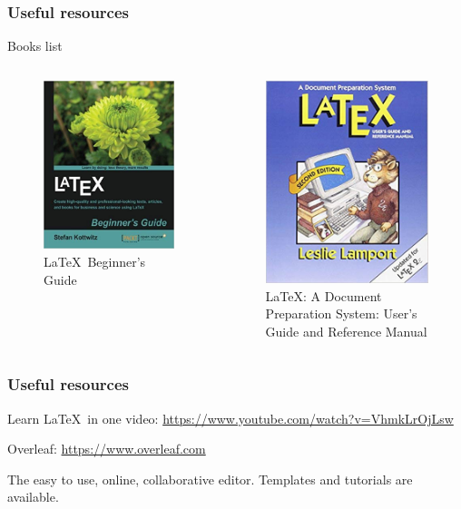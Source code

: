 \documentclass[11pt]{beamer}
\begin{document}
\begin{frame}
	\frametitle{Useful resources}

	Books list
	 \begin{columns}
		\centering
		\begin{figure}
			\includegraphics[width=.5\linewidth]{Figures/BeginnersGuide.jpg}
			\caption{\LaTeX \ Beginner's Guide}
		\end{figure}
		\centering
		\begin{figure}
			\includegraphics[width=.5\linewidth]{Figures/Lamport.jpg}
			\caption{\LaTeX: A Document Preparation System: User's Guide and Reference Manual}
		\end{figure}
	\end{columns}
\end{frame}

\begin{frame}
	\frametitle{Useful resources}

	Learn \LaTeX \ in one video: \url{https://www.youtube.com/watch?v=VhmkLrOjLsw}
	
	\bigskip
	
	Overleaf: \url{https://www.overleaf.com}
	
	The easy to use, online, collaborative editor. Templates and tutorials are available.

\end{frame}
\end{document}

